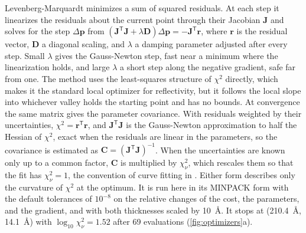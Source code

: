 Levenberg-Marquardt minimizes a sum of squared residuals.\autocite{marquardtAlgorithmLeastSquaresEstimation1963,levenbergMethodSolutionCertain1944} At each step it linearizes the residuals about the current point through their Jacobian \(\mathbf{J}\) and solves for the step \(\Delta\mathbf{p}\) from \(\left( \mathbf{J}^{\mathsf{T}}\mathbf{J} + \lambda\mathbf{D} \right)\Delta\mathbf{p} = - \mathbf{J}^{\mathsf{T}}\mathbf{r}\), where \(\mathbf{r}\) is the residual vector, \(\mathbf{D}\) a diagonal scaling, and \(\lambda\) a damping parameter adjusted after every step. Small \(\lambda\) gives the Gauss-Newton step, fast near a minimum where the linearization holds, and large \(\lambda\) a short step along the negative gradient, safe far from one. The method uses the least-squares structure of \(\chi^{2}\) directly, which makes it the standard local optimizer for reflectivity, but it follows the local slope into whichever valley holds the starting point and has no bounds. At convergence the same matrix gives the parameter covariance. With residuals weighted by their uncertainties, \(\chi^{2} = \mathbf{r}^{\mathsf{T}}\mathbf{r}\), and \(\mathbf{J}^{\mathsf{T}}\mathbf{J}\) is the Gauss-Newton approximation to half the Hessian of \(\chi^{2}\), exact when the residuals are linear in the parameters, so the covariance is estimated as \(\mathbf{C} = \left( \mathbf{J}^{\mathsf{T}}\mathbf{J} \right)^{- 1}\). When the uncertainties are known only up to a common factor, \(\mathbf{C}\) is multiplied by \(\chi_{\nu}^{2}\), which rescales them so that the fit has \(\chi_{\nu}^{2} = 1\), the convention of curve fitting in . Either form describes only the curvature of \(\chi^{2}\) at the optimum. It is run here in its MINPACK form with the default tolerances of \(10^{- 8}\) on the relative changes of the cost, the parameters, and the gradient, and with both thicknesses scaled by \qty{10}{\angstrom}. It stops at (\qty{210.4}{\angstrom}, \qty{14.1}{\angstrom}) with \(\log_{10}\chi_{\nu}^{2} = 1.52\) after 69 evaluations (\cref{fig:optimizers}a).

